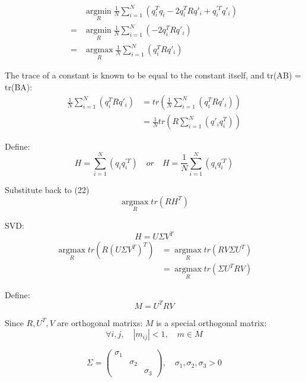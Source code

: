 \documentclass{article}
\begin{document}
\begin{align}
    &\mathop{\arg\min}\limits_{R}\frac{1}{N}\sum^{N}_{i=1}(q_i^Tq_i - 2q_i^TRq'_i + q_i^{\prime T}q'_i)\\
    =&\mathop{\arg\min}\limits_{R}\frac{1}{N}\sum^{N}_{i=1}(- 2q_i^TRq'_i)\\
    =&\mathop{\arg\max}\limits_{R}\frac{1}{N}\sum^{N}_{i=1}(q_i^TRq'_i)
\end{align}
\par
The trace of a constant is known to be equal to the constant itself, and tr(AB) = tr(BA):
\begin{align}
\frac{1}{N}\sum^{N}_{i=1}(q_i^TRq'_i)&=tr(\frac{1}{N}\sum^{N}_{i=1}(q_i^TRq'_i))\\
&=\frac{1}{N}tr(R\sum^{N}_{i=1}(q'_iq_i^T))
\end{align}
\par
Define:
\begin{equation}
    H = \sum^{N}_{i=1}(q_iq_i^{\prime T})\quad or \quad H = \frac{1}{N}\sum^{N}_{i=1}(q_iq_i^{\prime T})
\end{equation}
\par
Substitute back to (22)
\begin{equation}
    \mathop{\arg\max}\limits_{R}tr(RH^T)
\end{equation}
\par
SVD:
\begin{equation}
    H = U\Sigma V^T
\end{equation}
\begin{align}
\mathop{\arg\max}\limits_{R}tr(R(U\Sigma V^T)^T)&=\mathop{\arg\max}\limits_{R}tr(RV\Sigma U^T)\\
&=\mathop{\arg\max}\limits_{R}tr(\Sigma U^TRV)
\end{align}
\par
Define:
\begin{equation}
M=U^TRV
\end{equation}
\par
Since $R, U^T, V$ are orthogonal matrixs: $M$ is a special orthogonal matrix:
\begin{equation}
    \forall i,j, \quad |m_{ij}|<1, \quad  m \in M
\end{equation}

\begin{equation}
    \Sigma=
\begin{pmatrix}
    \sigma_1 &  & \\
     & \sigma_2 & \\
    &  & \sigma_3
\end{pmatrix}
,\quad \sigma_1, \sigma_2, \sigma_3 > 0
\end{equation}
\end{document}
